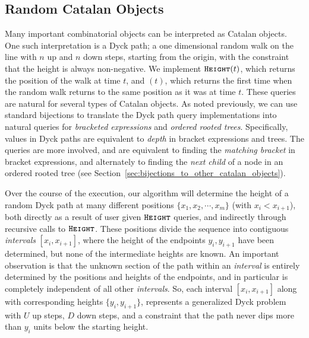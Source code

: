 \subsection{Random Catalan Objects}
\label{sec:overview_catalan_objects}
Many important combinatorial objects can be interpreted as Catalan objects.
One such interpretation is a Dyck path; a one dimensional random walk on the line with $n$ up and $n$ down steps, starting from the origin,
with the constraint that the height is always non-negative.
We implement $\texttt{\textsc{Height}}(t)$, which returns the position of the walk at time $t$,
and $(t)$, which returns the first time when the random walk returns to the same position as it was at time $t$.
These queries are natural for several types of Catalan objects.
As noted previously, we can use standard bijections to translate the Dyck path query implementations into
natural queries for \emph{bracketed expressions} and \emph{ordered rooted trees}.
Specifically,  values in Dyck paths are equivalent to \emph{depth} in bracket expressions and trees.
The  queries are more involved, and are equivalent to finding the \emph{matching bracket} in bracket expressions,
and alternately to finding the \emph{next child} of a node in an ordered rooted tree (see Section~\ref{sec:bijections_to_other_catalan_objects}).

Over the course of the execution, our algorithm will determine the height of a random Dyck path at many different positions $\{ x_1, x_2,\cdots, x_m\}$
(with $x_i<x_{i+1}$), both directly as a result of user given $\texttt{\textsc{Height}}$ queries, and indirectly through recursive calls to $\texttt{\textsc{Height}}$.
These positions divide the sequence into contiguous \emph{intervals} $[x_i,x_{i+1}]$,
where the height of the endpoints $y_i, y_{i+1}$ have been determined, but none of the intermediate heights are known.
An important observation is that the unknown section of the path within an \emph{interval}
is entirely determined by the positions and heights of the endpoints, and in particular is completely independent of all other \emph{intervals}.
So, each interval $[x_i,x_{i+1}]$ along with corresponding heights $\{y_i,y_{i+1}\}$,
represents a generalized Dyck problem with $U$ up steps, $D$ down steps,
and a constraint that the path never dips more than $y_i$ units below the starting height.

